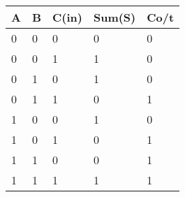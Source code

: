 
\begin{tabular}{|l|l|l|l|l|}
\hline
A & B & C(in) & Sum(S) & Co/t \\ \hline
0 & 0 & 0     & 0      & 0    \\
0 & 0 & 1     & 1      & 0    \\
0 & 1 & 0     & 1      & 0    \\ 
0 & 1 & 1     & 0      & 1    \\
1 & 0 & 0     & 1      & 0    \\
1 & 0 & 1     & 0      & 1    \\
1 & 1 & 0     & 0      & 1    \\
1 & 1 & 1     & 1      & 1    \\ \hline
\end{tabular}

